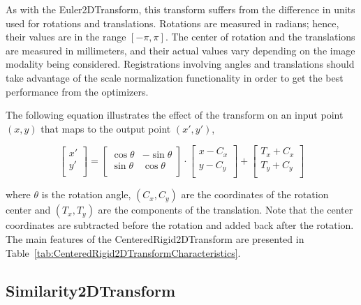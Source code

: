As with the Euler2DTransform, this transform suffers from the
difference in units used for rotations and translations. Rotations are
measured in radians; hence, their values are in the range $[-\pi,\pi]$. The
center of rotation and the translations are measured in millimeters, and their
actual values vary depending on the image modality being considered.
Registrations involving angles and translations should take advantage of the
scale normalization functionality in order to get the best performance from 
the optimizers.

The following equation illustrates the effect of the transform on an input
point $(x,y)$ that maps to the output point $(x',y')$,

\begin{equation}
\left[ 
\begin{array}{c}
x' \\
y' \\
\end{array}
\right]
=
\left[ 
\begin{array}{cc}
\cos{\theta} & -\sin{\theta} \\
\sin{\theta} &  \cos{\theta} \\
\end{array}
\right]
\cdot
\left[ 
\begin{array}{c}
x - C_x \\
y - C_y \\
\end{array}
\right]
+ 
\left[ 
\begin{array}{c}
T_x + C_x \\
T_y + C_y \\
\end{array}
\right]
\end{equation}

where $\theta$ is the rotation angle, $(C_x,C_y)$ are the coordinates of the
rotation center and $(T_x,T_y)$ are the components of the translation. Note
that the center coordinates are subtracted before the rotation and added back
after the rotation. The main features of the CenteredRigid2DTransform are 
presented in Table~\ref{tab:CenteredRigid2DTransformCharacteristics}.


\subsection{Similarity2DTransform}
\label{sec:Similarity2DTransform}

